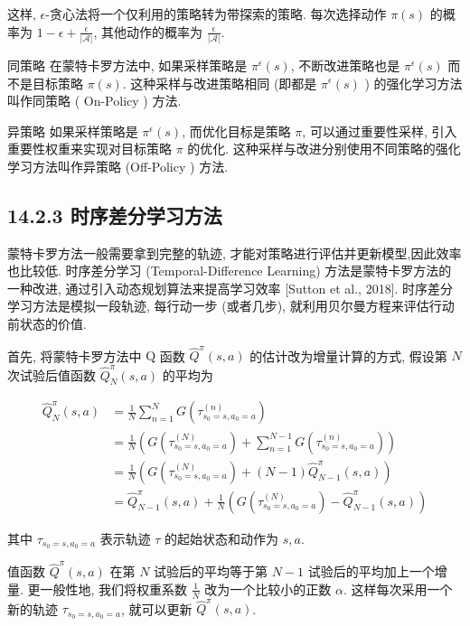 \documentclass[10pt]{article}
\begin{document}
这样, $\epsilon$-贪心法将一个仅利用的策略转为带探索的策略. 每次选择动作 $\pi(s)$ 的概率为 $1-\epsilon+\frac{\epsilon}{|\mathcal{A}|}$, 其他动作的概率为 $\frac{\epsilon}{|\mathcal{A}|}$.

同策略 在蒙特卡罗方法中, 如果采样策略是 $\pi^{\epsilon}(s)$, 不断改进策略也是 $\pi^{\epsilon}(s)$ 而不是目标策略 $\pi(s)$. 这种采样与改进策略相同 (即都是 $\pi^{\epsilon}(s)$ ) 的强化学习方法叫作同策略 ( On-Policy ) 方法.

异策略 如果采样策略是 $\pi^{\epsilon}(s)$, 而优化目标是策略 $\pi$, 可以通过重要性采样, 引入重要性权重来实现对目标策略 $\pi$ 的优化. 这种采样与改进分别使用不同策略的强化学习方法叫作异策略 (Off-Policy ) 方法.

\subsection*{14.2.3 时序差分学习方法}
蒙特卡罗方法一般需要拿到完整的轨迹, 才能对策略进行评估并更新模型,因此效率也比较低. 时序差分学习 (Temporal-Difference Learning) 方法是蒙特卡罗方法的一种改进, 通过引入动态规划算法来提高学习效率 [Sutton et al., 2018]. 时序差分学习方法是模拟一段轨迹, 每行动一步 (或者几步), 就利用贝尔曼方程来评估行动前状态的价值.

首先, 将蒙特卡罗方法中 $\mathrm{Q}$ 函数 $\hat{Q}^{\pi}(s, a)$ 的估计改为增量计算的方式, 假设第 $N$ 次试验后值函数 $\hat{Q}_{N}^{\pi}(s, a)$ 的平均为


\begin{align*}
\hat{Q}_{N}^{\pi}(s, a) & =\frac{1}{N} \sum_{n=1}^{N} G\left(\tau_{s_{0}=s, a_{0}=a}^{(n)}\right)  \tag{14.32}\\
& =\frac{1}{N}\left(G\left(\tau_{s_{0}=s, a_{0}=a}^{(N)}\right)+\sum_{n=1}^{N-1} G\left(\tau_{s_{0}=s, a_{0}=a}^{(n)}\right)\right)  \tag{14.33}\\
& =\frac{1}{N}\left(G\left(\tau_{s_{0}=s, a_{0}=a}^{(N)}\right)+(N-1) \hat{Q}_{N-1}^{\pi}(s, a)\right)  \tag{14.34}\\
& =\hat{Q}_{N-1}^{\pi}(s, a)+\frac{1}{N}\left(G\left(\tau_{s_{0}=s, a_{0}=a}^{(N)}\right)-\hat{Q}_{N-1}^{\pi}(s, a)\right) \tag{14.35}
\end{align*}


其中 $\tau_{s_{0}=s, a_{0}=a}$ 表示轨迹 $\tau$ 的起始状态和动作为 $s, a$.

值函数 $\hat{Q}^{\pi}(s, a)$ 在第 $N$ 试验后的平均等于第 $N-1$ 试验后的平均加上一个增量. 更一般性地, 我们将权重系数 $\frac{1}{N}$ 改为一个比较小的正数 $\alpha$. 这样每次采用一个新的轨迹 $\tau_{s_{0}=s, a_{0}=a}$, 就可以更新 $\hat{Q}^{\pi}(s, a)$.
\end{document}
